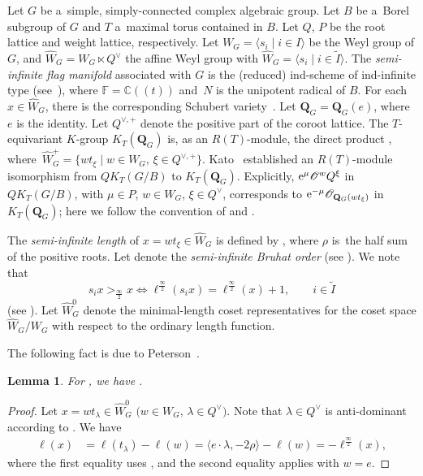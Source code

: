 \documentclass[pdftex]{sigma}
\numberwithin{equation}{section}
\newcommand{\C}{\mathbb{C}}
\newcommand{\Iaf}{\tilde{I}}
\renewcommand{\O}{\mathscr{O}}
\newcommand{\sinf}{\frac{\infty}{2}}
\newtheorem{Lemma}[Theorem]{Lemma}
\theoremstyle{definition}
\begin{document}
Let $G$ be a~simple, simply-connected complex algebraic group. Let $B$ be a~Borel subgroup of $G$ and $T$ a~maximal torus contained in $B$.
Let $Q$, $P$ be the root lattice and weight lattice, respectively.
Let $W_G=\langle s_i \mid i\in I\rangle$ be the Weyl group of $G$, and $\hat{W}_G=W_G\ltimes Q^\lor$ the affine Weyl group with $\hat{W}_G=\big\langle s_i \mid i\in \Iaf\big\rangle$.
The \emph{semi-infinite flag manifold} associated with $G$
is the (reduced) ind-scheme of ind-infinite type \smash{$\mathbf{Q}_G^{\mathrm{rat}}= G(\mathbb{F})/(T(\C)N(\mathbb{F}))$} (see~\cite{K:Fro,KNS}), where $\mathbb{F}=\C(\!(t)\!)$ and~$N$ is the unipotent radical of $B$. For each $x\in \hat{W}_G$, there is the corresponding Schubert variety~. Let $\mathbf{Q}_G=\mathbf{Q}_G(e)$, where $e$ is the identity.
Let $Q^{\lor,+}$ denote the positive part of the coroot lattice.
The $T$-equivariant $K$-group $K_T(\mathbf{Q}_G)$ is, as an $R(T)$-module, the direct product \smash{$\prod_{x\in \hat{W}_{G}^{+}}R(T)\O_{\mathbf{Q}_G(x)}$}, where~${\hat{W}_{G}^{+}=
\big\{wt_\xi\mid w\in W_G,\, \xi\in Q^{\lor,+}\big\}}$.
Kato~\cite{Kato} established an $R(T)$-module isomorphism from
$QK_T(G/B)$ to $K_T(\mathbf{Q}_G)$.
Explicitly,
${\rm e}^\mu \O^wQ^\xi$ in $QK_T(G/B)$, with $\mu\in P$, $w\in W_G$, $\xi \in Q^\lor$,
corresponds to
${\rm e}^{-\mu}\O_{\mathbf{Q}_G(wt_\xi)}$
in $K_T(\mathbf{Q}_G)$; here we follow the convention of \cite[Section~6.1]{LNS:Se} and \cite[Section~5]{MNS1}.


The \emph{semi-infinite length} of $x=wt_\xi\in \hat{W}_G$
is defined by
\smash{$\ell^\sinf(w)
=\ell(w)+2\langle \rho,\xi\rangle$}, where $\rho$ is~the half sum of the positive roots.
Let \smash{$\le_\sinf$} denote the \emph{semi-infinite Bruhat order} (see \cite[Section~2.4]{INS}).
We note that
\[
s_i x>_\sinf x\Longleftrightarrow \ell^\sinf(s_ix)=\ell^\sinf(x)+1, \qquad i\in \tilde{I}
\] (see \cite[Lemma~4.1.2]{INS}).
Let $\hat{W}_G^0$ denote the minimal-length coset representatives for the coset space $\hat{W}_G/W_G$
with respect to the ordinary length function.

The following fact is due to Peterson~\cite{Pet}.
\begin{Lemma}\label{lem:sinf}
For , we have
\smash{$\ell(x)=-\ell^{\sinf}(x)$}.
\end{Lemma}
\begin{proof}
Let $x=wt_\lambda\in \hat{W}_G^0$ $\bigl(w\in W_G, \, \lambda\in Q^\vee\bigr)$. Note that $\lambda\in Q^\vee$ is anti-dominant according to \cite[Lemma 3.3]{LS:Acta}.
We have
\begin{align*}
 \ell(x)&=\ell(t_\lambda)-\ell(w)=\langle e\cdot \lambda,-2\rho\rangle-\ell(w)=-\ell^\sinf(x),
\end{align*}
where the first equality uses \cite[Lemma 3.3]{LS:Acta}, and the second equality applies \cite[Lemma 3.2]{LS:Acta} with $w=e$.
\end{proof}
\end{document}
